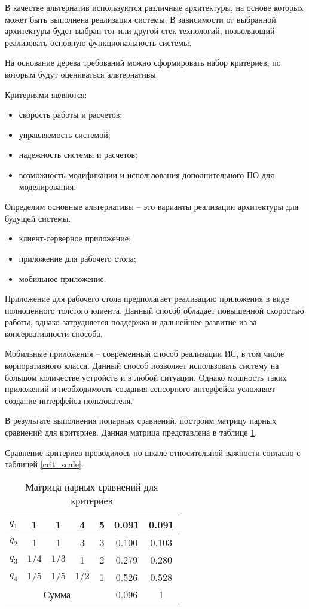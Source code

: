 В качестве альтернатив используются различные архитектуры, на основе которых может быть выполнена реализация системы. 
В зависимости от выбранной архитектуры будет выбран тот или другой стек технологий, позволяющий реализовать основную функциональность системы. 

На основание дерева требований можно сформировать набор критериев, по которым будут оцениваться альтернативы

Критериями являются:
\begin{itemize}
  \item скорость работы и расчетов;
  \item управляемость системой;
  \item надежность системы и расчетов;
  \item возможность модификации и использования дополнительного ПО для моделирования.
\end{itemize}

Определим основные альтернативы – это варианты реализации архитектуры для будущей системы.
\begin{itemize}
    \item клиент-серверное приложение;
    \item приложение для рабочего стола;
    \item мобильное приложение.
\end{itemize}

Приложение для рабочего стола предполагает реализацию приложения в виде полноценного толстого клиента. 
Данный способ обладает повышенной скоростью работы, однако затрудняется поддержка и дальнейшее развитие из-за консервативности способа. 

Мобильные приложения – современный способ реализации ИС, в том числе корпоративного класса. 
Данный способ позволяет использовать систему на большом количестве устройств и в любой ситуации. 
Однако мощность таких приложений и необходимость создания сенсорного интерфейса усложняет создание интерфейса пользователя.

В результате выполнения попарных сравнений, построим матрицу парных сравнений для критериев. 
Данная матрица представлена в таблице \ref{crit_compare}.

Сравнение критериев проводилось по шкале относительной важности согласно с таблицей \ref{crit_scale}.

\begin{table}[H]
    \caption{Матрица парных сравнений для критериев}\label{crit_compare}
     \begin{tabular}{|c|c|c|c|c|c|c|}
    \hline $q_1$ & 1 & 1 & 4 & 5 & 0.091 & 0.091 \\
    \hline $q_2$ & 1 & 1 & 3 & 3 & 0.100 & 0.103 \\
    \hline $q_3$ & $1/4$ & $1/3$ & 1 & 2 & 0.279 & 0.280 \\
    \hline $q_4$ & $1/5$ & $1/5$ & $1/2$ & 1 & 0.526 & 0.528 \\
    \hline \multicolumn{5}{|c|}{Сумма} & 0.096 & 1 \\
    \hline
    \end{tabular}
  \end{table}

